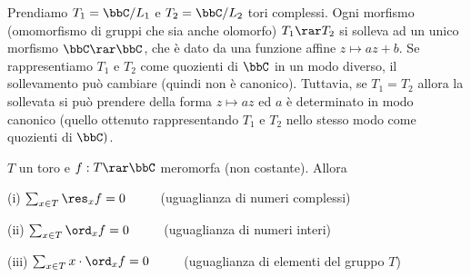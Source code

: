 
Prendiamo $T_1=\bbC/L_1$ e $T_2=\bbC/L_2$ tori complessi.
Ogni morfismo (omomorfismo di gruppi che sia anche olomorfo) $T_1\rar T_2$ si solleva ad un unico morfismo $\bbC\rar\bbC$, che è dato da una funzione affine $z \mapsto az + b$.
Se rappresentiamo $T_1$ e $T_2$ come quozienti di $\bbC$ in un modo diverso, il sollevamento può cambiare (quindi non è canonico).
Tuttavia, se $T_1=T_2$ allora la sollevata si può prendere della forma $z \mapsto az$ ed $a$ è determinato in modo canonico (quello ottenuto rappresentando $T_1$ e $T_2$ nello stesso modo come quozienti di $\bbC)$.

\begin{teorema}
  \label{residui-funzioni-toriche}
$T$ un toro e $f:T\rar\bbC$ meromorfa (non costante). Allora

(i) $\sum_{x\in T}\res_xf=0$ $\qquad$ (uguaglianza di numeri complessi)

(ii) $\sum_{x\in T}\ord_xf=0$ $\qquad$ (uguaglianza di numeri interi)

(iii) $\sum_{x\in T}x\cdot\ord_xf=0$ $\qquad$ (uguaglianza di elementi del gruppo $T$)
\end{teorema}



